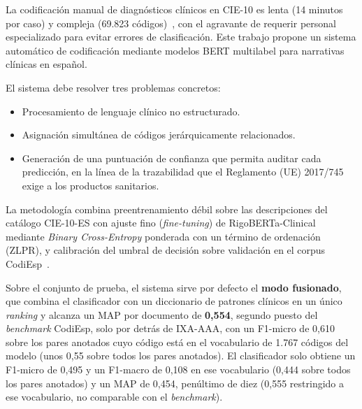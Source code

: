 \pagestyle{plain}	%


\begin{resumenPral}[spanish]{\titulo} %
La codificación manual de diagnósticos clínicos en CIE-10 es lenta (14 minutos por caso) y compleja (69.823 códigos)~\cite{gogorcena2017cie10es, sanidad2016cie10}, con el agravante de requerir personal especializado para evitar errores de clasificación. Este trabajo propone un sistema automático de codificación mediante modelos BERT multilabel para narrativas clínicas en español.

El sistema debe resolver tres problemas concretos:

\begin{itemize}
 \item Procesamiento de lenguaje clínico no estructurado.
 \item Asignación simultánea de códigos jerárquicamente relacionados.
 \item Generación de una puntuación de confianza que permita auditar cada predicción, en la línea de la trazabilidad que el Reglamento (UE) 2017/745~\cite{eu2017745} exige a los productos sanitarios.
\end{itemize}

La metodología combina preentrenamiento débil sobre las descripciones del catálogo CIE-10-ES con ajuste fino (\emph{fine-tuning}) de RigoBERTa-Clinical~\cite{garciasubies2026rigobertaclinical} mediante \emph{Binary Cross-Entropy} ponderada con un término de ordenación (ZLPR), y calibración del umbral de decisión sobre validación en el corpus CodiEsp~\cite{miranda2020}.

Sobre el conjunto de prueba, el sistema sirve por defecto el \textbf{modo fusionado}, que combina el clasificador con un diccionario de patrones clínicos en un único \emph{ranking} y alcanza un MAP por documento de \textbf{0,554}, segundo puesto del \emph{benchmark} CodiEsp, solo por detrás de IXA-AAA, con un F1-micro de 0,610 sobre los pares anotados cuyo código está en el vocabulario de 1.767 códigos del modelo (unos 0,55 sobre todos los pares anotados). El clasificador solo obtiene un F1-micro de 0,495 y un F1-macro de 0,108 en ese vocabulario (0,444 sobre todos los pares anotados) y un MAP de 0,454, penúltimo de diez (0,555 restringido a ese vocabulario, no comparable con el \emph{benchmark}).


\end{resumenPral}
